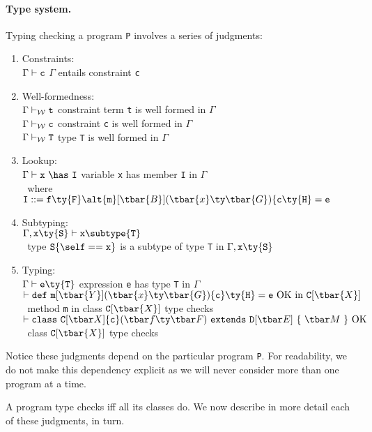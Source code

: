 \paragraph{Type system.} Typing checking a program {\tt P} involves a series of judgments:
\begin{enumerate}
	\item Constraints:\\
	  $\Gamma\vdash {\tt c}$ \hfill $\Gamma$ entails constraint {\tt c}
	\item Well-formedness:\\
	  ${\Gamma} \vdash_{\cal W}{\tt t}$ \hfill constraint term {\tt t} is well formed in $\Gamma$\\
	  ${\Gamma} \vdash_{\cal W}{\tt c}$ \hfill constraint {\tt c} is well formed in $\Gamma$\\
	  ${\Gamma} \vdash_{\cal W}{\tt T}$ \hfill  type {\tt T} is well formed in $\Gamma$
	\item Lookup:\\
	  $\Gamma\vdash {\tt x}~\has~{\tt I}$ \hfill variable {\tt x} has member {\tt I} in $\Gamma$\\
	  $~$ \hfill where ${\tt I}::= {\tt f}\ty{\tt F} \alt {\tt m}[\tbar{B}](\tbar{x}\ty \tbar{G})\{{\tt c}\ty {\tt H}={\tt e}$
	\item Subtyping:\\
	  $\Gamma,{\tt x}\ty{\tt S}\vdash{\tt x}\subtype{\tt T}$ \\ $~$ \hfill type ${\tt S}\{\self=={\tt x}\}$ is a 	subtype of type {\tt T} in $\Gamma,{\tt x}\ty{\tt S}$
	\item Typing:\\
	  $\Gamma\vdash {\tt e}\ty{\tt T}$ \hfill expression {\tt e} has type {\tt T} in $\Gamma$\\
	  $\vdash {\tt def}~{\tt m}[\tbar{Y}](\tbar{x}\ty \tbar{G})\{{\tt c}\}\ty {\tt H}={\tt e}~{\rm OK~in}~{\tt C}[\tbar{X}]$ \\ $~$ \hfill method {\tt m} in class ${\tt C}[\tbar{X}]$ type checks\\
	  $\vdash \cdecl~{\rm OK}$ \\ $~$ \hfill class ${\tt C}[\tbar{X}]$ type checks

\end{enumerate}

Notice these judgments depend on the particular program {\tt P}. For readability, we do not make this dependency explicit as we will never consider more than one program at a time.

A program type checks iff all its classes do. We now describe in more detail each of these judgments, in turn. 


